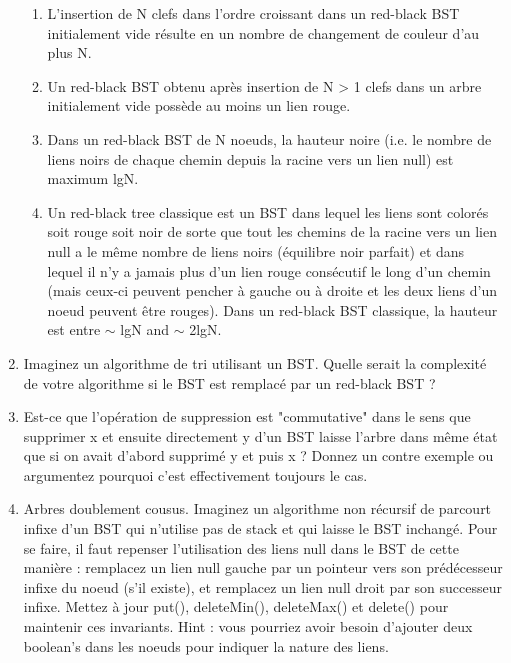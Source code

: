 \documentclass[11pt]{article}
\begin{document}
\begin{enumerate}
\begin{enumerate}
\item L'insertion de N clefs dans l'ordre croissant dans un red-black BST initialement
vide résulte en un nombre de changement de couleur d'au plus N.\\

\item Un red-black BST obtenu après insertion de N > 1 clefs dans un arbre initialement
vide possède au moins un lien rouge.\\

\item Dans un red-black BST de N noeuds, la hauteur noire (i.e. le nombre de liens
noirs de chaque chemin depuis la racine vers un lien null) est maximum lgN.\\

\item Un red-black tree classique est un BST dans lequel les liens sont colorés soit
rouge soit noir de sorte que tout les chemins de la racine vers un lien null a
le même nombre de liens noirs (équilibre noir parfait) et dans lequel il n'y
a jamais plus d'un lien rouge consécutif le long d'un chemin (mais ceux-ci
peuvent pencher à gauche ou à droite et les deux liens d'un noeud peuvent
être rouges). Dans un red-black BST classique, la hauteur est entre $\sim$ lgN
and $\sim$ 2lgN.
\end{enumerate}
\item Imaginez un algorithme de tri utilisant un BST. Quelle serait la complexité de
votre algorithme si le BST est remplacé par un red-black BST ?
\item Est-ce que l’opération de suppression est "commutative" dans le sens que supprimer
x et ensuite directement y d’un BST laisse l’arbre dans même état que si on
avait d’abord supprimé y et puis x ? Donnez un contre exemple ou argumentez
pourquoi c’est effectivement toujours le cas.
\item Arbres doublement cousus. Imaginez un algorithme non récursif de parcourt infixe
d’un BST qui n’utilise pas de stack et qui laisse le BST inchangé. Pour se faire, il
faut repenser l’utilisation des liens null dans le BST de cette manière : remplacez
un lien null gauche par un pointeur vers son prédécesseur infixe du noeud
(s’il existe), et remplacez un lien null droit par son successeur infixe. Mettez
à jour put(), deleteMin(), deleteMax() et delete() pour maintenir
ces invariants. Hint : vous pourriez avoir besoin d’ajouter deux boolean’s dans
les noeuds pour indiquer la nature des liens.
\end{enumerate}
\end{document}
